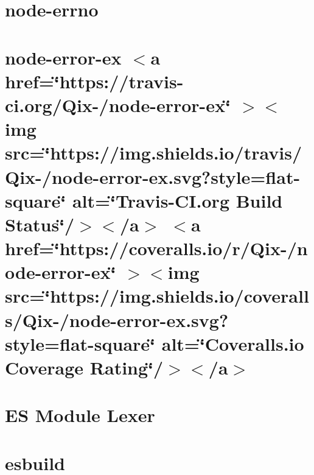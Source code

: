 \documentclass[twoside]{book}
\newcommand{\+}{\discretionary{\mbox{\scriptsize$\hookleftarrow$}}{}{}}
\begin{document}
\chapter{node-\/errno}
\label{md__c___users_vaishnavi_jadhav__desktop__developer_code_mean_stack_example_client_node_modules_errno__r_e_a_d_m_e}

\chapter{node-\/error-\/ex \texorpdfstring{$<$}{<}a href=\char`\"{}https\+://travis-\/ci.\+org/\+Qix-\//node-\/error-\/ex\char`\"{} \texorpdfstring{$>$}{>}\texorpdfstring{$<$}{<}img src=\char`\"{}https\+://img.\+shields.\+io/travis/\+Qix-\//node-\/error-\/ex.\+svg?style=flat-\/square\char`\"{} alt=\char`\"{}\+Travis-\/\+CI.\+org Build Status\char`\"{}/\texorpdfstring{$>$}{>}\texorpdfstring{$<$}{<}/a\texorpdfstring{$>$}{>} \texorpdfstring{$<$}{<}a href=\char`\"{}https\+://coveralls.\+io/r/\+Qix-\//node-\/error-\/ex\char`\"{} \texorpdfstring{$>$}{>}\texorpdfstring{$<$}{<}img src=\char`\"{}https\+://img.\+shields.\+io/coveralls/\+Qix-\//node-\/error-\/ex.\+svg?style=flat-\/square\char`\"{} alt=\char`\"{}\+Coveralls.\+io Coverage Rating\char`\"{}/\texorpdfstring{$>$}{>}\texorpdfstring{$<$}{<}/a\texorpdfstring{$>$}{>}}
\label{md__c___users_vaishnavi_jadhav__desktop__developer_code_mean_stack_example_client_node_modules_error_ex__r_e_a_d_m_e}

\chapter{ES Module Lexer}
\label{md__c___users_vaishnavi_jadhav__desktop__developer_code_mean_stack_example_client_node_modules_es_module_lexer__r_e_a_d_m_e}

\chapter{esbuild}
\label{md__c___users_vaishnavi_jadhav__desktop__developer_code_mean_stack_example_client_node_modules_esbuild_wasm__r_e_a_d_m_e}

\end{document}
